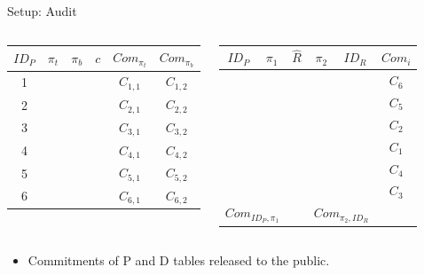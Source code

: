 \documentclass{beamer}
\begin{document}
\begin{frame}{Setup: Audit}
	\begingroup
	\fontsize{8pt}{10pt}\selectfont
	\begin{columns}
		\begin{center}
			\begin{tabular}{|c|c|c|c|c|c|}
				\hline
				$ID_P$ & $\pi_{t}$ & $\pi_{b}$ & $c$ & $Com_{\pi_{t}}$ & $Com_{\pi_{b}}$ \\
				\hline
				1 & & & & $C_{1, 1}$ & $C_{1, 2}$ \\
				2 & & & & $C_{2, 1}$ & $C_{2, 2}$ \\
				3 & & & & $C_{3, 1}$ & $C_{3, 2}$ \\
				4 & & & & $C_{4, 1}$ & $C_{4, 2}$ \\
				5 & & & & $C_{5, 1}$ & $C_{5, 2}$ \\
				6 & & & & $C_{6, 1}$ & $C_{6, 2}$ \\
				\hline
			\end{tabular}
		\end{center}

		\begin{center}
			\begin{tabular}{|c|c|c|c|c|c|}
				\hline
				$ID_P$ & $\pi_1$ & $\hat{R}$ & $\pi_2$ & $ID_R$ & $Com_{i}$ \\
				\hline
				& & & & & $C_6$ \\
				& & & & & $C_5$ \\
				& & & & & $C_2$ \\
				& & & & & $C_1$ \\
				& & & & & $C_4$ \\
				& & & & & $C_3$ \\
				\hline
				\multicolumn{2}{|c|}{$Com_{ID_P, \pi_1}$} &   & \multicolumn{2}{c|}{$Com_{\pi_2, ID_R}$} & \\
				\hline
			\end{tabular}
		\end{center}
	\end{columns}
	\endgroup

	\begin{itemize}
		\item Commitments of P and D tables released to the public.
	\end{itemize}
\end{frame}
\end{document}
